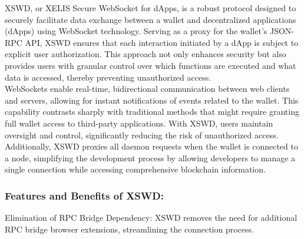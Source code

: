 \documentclass[12pt,a4paper,twocolumn]{article}
\begin{document}
XSWD, or XELIS Secure WebSocket for dApps, is a robust protocol designed to securely facilitate data exchange between a wallet and decentralized applications (dApps) using WebSocket technology. Serving as a proxy for the wallet's JSON-RPC API, XSWD ensures that each interaction initiated by a dApp is subject to explicit user authorization. This approach not only enhances security but also provides users with granular control over which functions are executed and what data is accessed, thereby preventing unauthorized access.\\

WebSockets enable real-time, bidirectional communication between web clients and servers, allowing for instant notifications of events related to the wallet. This capability contrasts sharply with traditional methods that might require granting full wallet access to third-party applications. With XSWD, users maintain oversight and control, significantly reducing the risk of unauthorized access.\\

Additionally, XSWD proxies all daemon requests when the wallet is connected to a node, simplifying the development process by allowing developers to manage a single connection while accessing comprehensive blockchain information.\\

\subsubsection{Features and Benefits of XSWD:}

Elimination of RPC Bridge Dependency: XSWD removes the need for additional RPC bridge browser extensions, streamlining the connection process.\\
\end{document}
